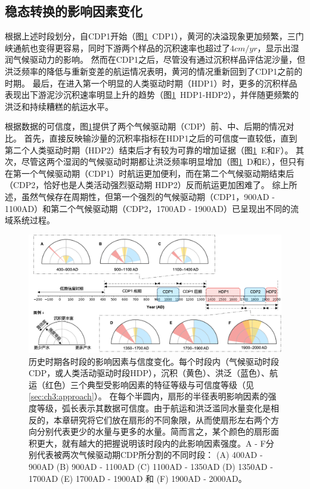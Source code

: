 \subsection{稳态转换的影响因素变化}

根据上述时段划分，自CDP1开始（图\ref{fig:ch3:impacts}~CDP1），黄河的决溢现象更加频繁，三门峡通航也变得更容易，同时下游两个样品的沉积速率也超过了$4cm/yr$，显示出湿润气候驱动力的影响。
然而在CDP1之后，尽管没有通过沉积样品评估泥沙量，但洪泛频率的降低与重新变差的航运情况表明，黄河的情况重新回到了CDP1之前的时期。
最后，在进入第一个明显的人类驱动时期（HDP1）时，更多的沉积样品表现出下游泥沙沉积速率明显上升的趋势（图\ref{fig:ch3:impacts}~HDP1-HDP2），并伴随更频繁的洪泛和持续糟糕的航运水平。


根据数据的可信度，图\ref{fig:ch3:impacts}提供了两个气候驱动期（CDP）前、中、后期的情况对比。
首先，直接反映输沙量的沉积率指标在HDP1之后的可信度一直较低，直到第二个人类驱动时期（HDP2）结束后才有较为可靠的增加证据（图\ref{fig:ch3:impacts}~E和F）。
其次，尽管这两个湿润的气候驱动时期都让洪泛频率明显增加（图\ref{fig:ch3:impacts}~D和E），但只有在第一个气候驱动期（CDP1）时航运更加便利，而在第二个气候驱动期结束后（CDP2，恰好也是人类活动强烈驱动期 HDP2）反而航运更加困难了。
综上所述，虽然气候存在周期性，但第一个强烈的气候驱动期（CDP1，900AD - 1100AD）和第二个气候驱动期（CDP2，1700AD - 1900AD）已呈现出不同的流域系统过程。

\begin{figure}[!ht] %
    \includegraphics[width=\textwidth]{img/ch3/ch3_impacts.png}
    \caption[历史时期各时段的影响因素与信度变化]{历史时期各时段的影响因素与信度变化。每个时段内（气候驱动时段CDP，或人类活动驱动时段HDP），沉积（黄色）、洪泛（蓝色）、航运（红色）三个典型受影响因素的特征等级与可信度等级（见\ref{sec:ch3:approach}）。
    在每个半圆内，扇形的半径表明影响因素的强度等级，弧长表示其数据可信度。由于航运和洪泛滥同水量变化是相反的，本章研究将它们放在扇形的不同象限，从而使扇形左右两个方向分别代表更少的水量与更多的水量。简而言之，某个颜色的扇形面积更大，就有越大的把握说明该时段内的此影响因素强度。A - F分别代表被两次气候驱动期CDP所分割的不同时段： (A) 400AD - 900AD (B) 900AD - 1100AD (C) 1100AD - 1350AD (D) 1350AD - 1700AD (E) 1700AD - 1900AD 和 (F) 1900AD - 2000AD。}\label{fig:ch3:impacts}
\end{figure}
